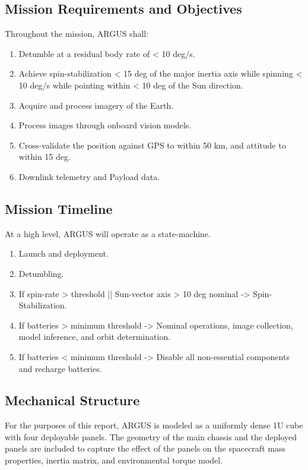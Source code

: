 \documentclass[conference,onecolumn,draftclsnofoot]{IEEEtran}
\begin{document}
\subsection{Mission Requirements and Objectives}
Throughout the mission, ARGUS shall:
\begin{enumerate}
    \item Detumble at a residual body rate of < 10 deg/s.
    \item Achieve spin-stabilization < 15 deg of the major inertia axis while spinning < 10 deg/s while pointing within < 10 deg of the Sun direction.
    \item Acquire and process imagery of the Earth.
    \item Process images through onboard vision models.
    \item Cross-validate the position against GPS to within 50 km, and attitude to within 15 deg.
    \item Downlink telemetry and Payload data.
\end{enumerate}

\subsection{Mission Timeline}
At a high level, ARGUS will operate as a state-machine.

\begin{enumerate}
    \item Launch and deployment.
    \item Detumbling.
    \item If spin-rate > threshold || Sun-vector axis > 10 deg nominal -> Spin-Stabilization.
    \item If batteries > minimum threshold -> Nominal operations, image collection, model inference, and orbit determination.
    \item If batteries < minimum threshold -> Disable all non-essential components and recharge batteries.
\end{enumerate}

\subsection{Mechanical Structure}
For the purposes of this report, ARGUS is modeled as a uniformly dense 1U cube with four deployable panels. The geometry of the main chassis and the deployed panels are included to capture the effect of the panels on the spacecraft mass properties, inertia matrix, and environmental torque model.
\end{document}
